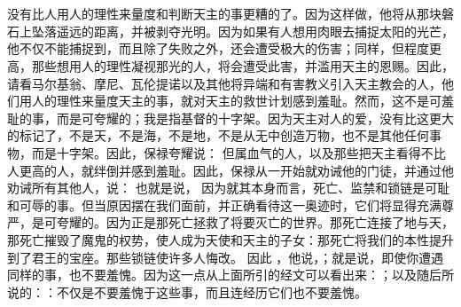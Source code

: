 

\section{}

\par

\par

没有比人用人的理性来量度和判断天主的事更糟的了。因为这样做，他将从那块磐石上坠落遥远的距离，并被剥夺光明。因为如果有人想用肉眼去捕捉太阳的光芒，他不仅不能捕捉到，而且除了失败之外，还会遭受极大的伤害；同样，但程度更高，那些想用人的理性凝视那光的人，将会遭受此害，并滥用天主的恩赐。因此，请看马尔基翁、摩尼、瓦伦提诺以及其他将异端和有害教义引入天主教会的人，他们用人的理性来量度天主的事，就对天主的救世计划感到羞耻。然而，这不是可羞耻的事，而是可夸耀的；我是指基督的十字架。因为天主对人的爱，没有比这更大的标记了，不是天，不是海，不是地，不是从无中创造万物，也不是其他任何事物，而是十字架。因此，保禄夸耀说： 但属血气的人，以及那些把天主看得不比人更高的人，就绊倒并感到羞耻。因此，保禄从一开始就劝诫他的门徒，并通过他劝诫所有其他人，说： 也就是说， 因为就其本身而言，死亡、监禁和锁链是可耻和可辱的事。但当原因摆在我们面前，并正确看待这一奥迹时，它们将显得充满尊严，是可夸耀的。因为正是那死亡拯救了将要灭亡的世界。那死亡连接了地与天，那死亡摧毁了魔鬼的权势，使人成为天使和天主的子女：那死亡将我们的本性提升到了君王的宝座。那些锁链使许多人悔改。 因此 ，他说，；就是说，即使你遭遇同样的事，也不要羞愧。因为这一点从上面所引的经文可以看出来：；以及随后所说的：：不仅是不要羞愧于这些事，而且连经历它们也不要羞愧。\par

